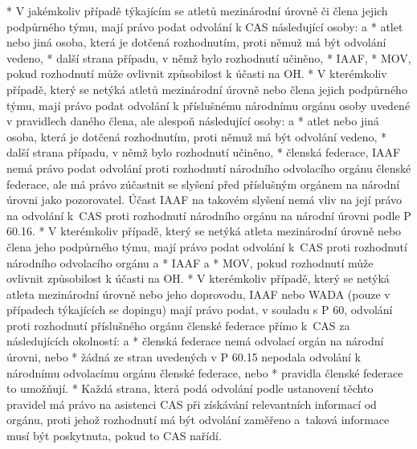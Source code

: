 * V jakémkoliv případě týkajícím se atletů mezinárodní úrovně či člena jejich podpůrného týmu, mají právo podat odvolání k CAS následující osoby:
  \begitems \style a
  * atlet nebo jiná osoba, která je dotčená rozhodnutím, proti němuž má být odvolání vedeno,
  * další strana případu, v němž bylo rozhodnutí učiněno,
  * IAAF,
  * MOV, pokud rozhodnutí může ovlivnit způsobilost k účasti na OH.
  \enditems
* V kterémkoliv případě, který se netýká atletů mezinárodní úrovně nebo člena jejich podpůrného týmu, mají právo podat odvolání k příslušnému národnímu orgánu osoby uvedené v pravidlech daného člena, ale alespoň následující osoby:
  \begitems \style a
  * atlet nebo jiná osoba, která je dotčená rozhodnutím, proti němuž má být odvolání vedeno,
  * další strana případu, v němž bylo rozhodnutí učiněno,
  * členská federace,
  \enditems
IAAF nemá právo podat odvolání proti rozhodnutí národního odvolacího orgánu členské federace, ale má právo zúčastnit se slyšení před příslušným orgánem na národní úrovni jako pozorovatel. Účast IAAF na takovém slyšení nemá vliv na její právo na odvolání k~CAS proti rozhodnutí národního orgánu na národní úrovni podle P 60.16.
* V kterémkoliv případě, který se netýká atleta mezinárodní úrovně nebo člena jeho podpůrného týmu, mají právo podat odvolání k~CAS proti rozhodnutí národního odvolacího orgánu
  \begitems \style a
  * IAAF a
  * MOV, pokud rozhodnutí může ovlivnit způsobilost k účasti na OH.
  \enditems
* V kterémkoliv případě, který se netýká atleta mezinárodní úrovně nebo jeho doprovodu, IAAF nebo WADA (pouze v případech týkajících se dopingu) mají právo podat, v souladu s P 60, odvolání proti rozhodnutí příslušného orgánu členské federace přímo k~CAS za následujících okolností:
  \begitems \style a
  * členská federace nemá odvolací orgán na národní úrovni, nebo
  * žádná ze stran uvedených v P 60.15 nepodala odvolání k národnímu odvolacímu orgánu členské federace, nebo
  * pravidla členské federace to umožňují.
  \enditems
* Každá strana, která podá odvolání podle ustanovení těchto pravidel má právo na asistenci CAS při získávání relevantních informací od orgánu, proti jehož rozhodnutí má být odvolání zaměřeno a~taková informace musí být poskytnuta, pokud to CAS nařídí.

